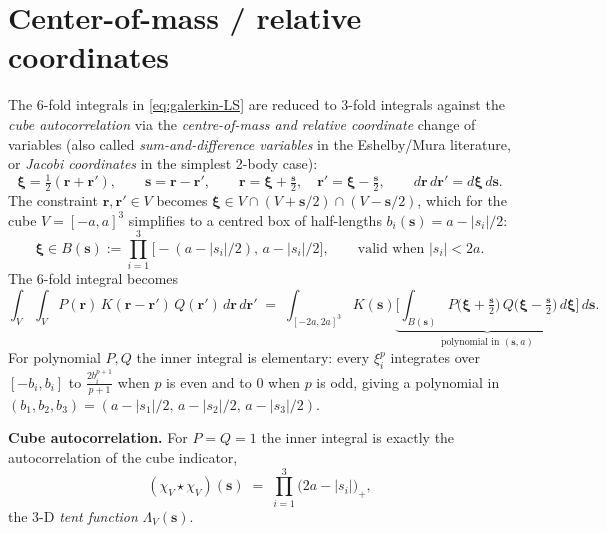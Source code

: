 \documentclass[11pt,a4paper]{article}
\newcommand{\bs}{\bm{s}}
\newcommand{\br}{\bm{r}}
\newcommand{\bxi}{\bm{\xi}}
\newcommand{\indV}{\chi_V}
\theoremstyle{plain}
\theoremstyle{definition}
\theoremstyle{remark}
\begin{document}
\section{Center-of-mass / relative coordinates}
\label{sec:cm-relative}

The 6-fold integrals in \eqref{eq:galerkin-LS} are reduced to 3-fold
integrals against the \emph{cube autocorrelation} via the \emph{centre-of-mass and relative coordinate} change of variables (also called \emph{sum-and-difference variables} in the Eshelby/Mura literature, or \emph{Jacobi coordinates} in the simplest 2-body case):
\begin{equation}
   \bxi = \tfrac{1}{2}(\br + \br'), \qquad \bs = \br - \br',
   \qquad \br = \bxi + \tfrac{\bs}{2}, \quad \br' = \bxi - \tfrac{\bs}{2},
   \qquad d\br\,d\br' = d\bxi\,d\bs.
\end{equation}
The constraint $\br,\br' \in V$ becomes $\bxi \in V \cap (V + \bs/2)\cap (V - \bs/2)$, which for the cube $V = [-a,a]^{3}$ simplifies to a centred box of half-lengths
$b_i(\bs) = a - |s_i|/2$:
\begin{equation}
   \bxi \in B(\bs) := \prod_{i=1}^{3} \big[-(a - |s_i|/2),\, a - |s_i|/2\big],
   \qquad \text{valid when } |s_i| < 2a.
\end{equation}
The 6-fold integral becomes
\begin{equation}
   \int_{V}\!\!\int_{V} P(\br)\,K(\br - \br')\,Q(\br')\,d\br\,d\br'
   \;=\; \int_{[-2a,2a]^{3}}\! K(\bs)
        \underbrace{\Big[\int_{B(\bs)}\!P\!\big(\bxi+\tfrac{\bs}{2}\big)\,Q\!\big(\bxi-\tfrac{\bs}{2}\big)\,d\bxi\Big]}_{\text{polynomial in } (\bs, a)}\,d\bs.
   \label{eq:cm-relative}
\end{equation}
For polynomial $P,Q$ the inner integral is elementary: every $\xi_i^{p}$
integrates over $[-b_i, b_i]$ to $\frac{2 b_i^{p+1}}{p+1}$ when $p$ is even and to $0$
when $p$ is odd, giving a polynomial in
$(b_1,b_2,b_3) = (a-|s_1|/2,\,a-|s_2|/2,\,a-|s_3|/2)$.

\medskip

\noindent\textbf{Cube autocorrelation.} For $P = Q = 1$ the inner integral
is exactly the autocorrelation of the cube indicator,
\begin{equation}
   (\indV \star \indV)(\bs) \;=\; \prod_{i=1}^{3} \big(2a - |s_i|\big)_{+},
\end{equation}
the 3-D \emph{tent function} $\Lambda_V(\bs)$.
\end{document}
